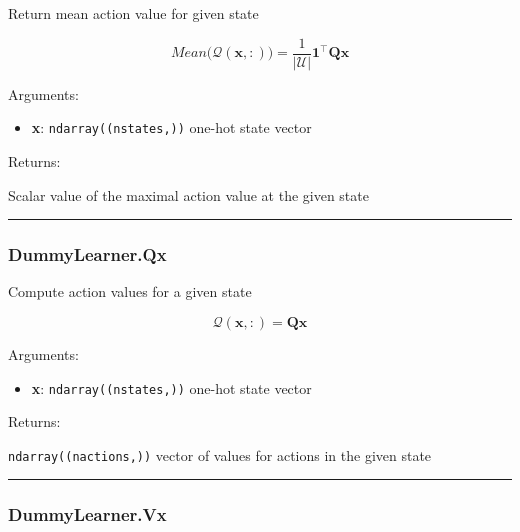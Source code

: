 Return mean action value for given state

\[
Mean \big(\mathcal Q(\mathbf x, :)\big) = \frac{1}{|\mathcal U|} \mathbf 1^\top \mathbf Q \mathbf x
\]

Arguments:

\begin{itemize}
\tightlist
\item
  \textbf{x}: \texttt{ndarray((nstates,))} one-hot state vector
\end{itemize}

Returns:

Scalar value of the maximal action value at the given state

\begin{center}\rule{0.5\linewidth}{\linethickness}\end{center}

\hypertarget{dummylearner.qx}{%
\subsubsection{DummyLearner.Qx}\label{dummylearner.qx}}

\begin{Shaded}
\begin{Highlighting}[]
\end{Highlighting}
\end{Shaded}

Compute action values for a given state

\[
\mathcal Q(\mathbf x, :) = \mathbf Q \mathbf x
\]

Arguments:

\begin{itemize}
\tightlist
\item
  \textbf{x}: \texttt{ndarray((nstates,))} one-hot state vector
\end{itemize}

Returns:

\texttt{ndarray((nactions,))} vector of values for actions in the given
state

\begin{center}\rule{0.5\linewidth}{\linethickness}\end{center}

\hypertarget{dummylearner.vx}{%
\subsubsection{DummyLearner.Vx}\label{dummylearner.vx}}

